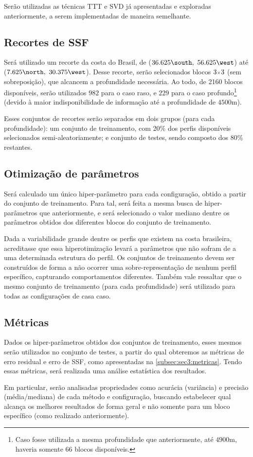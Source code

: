 Serão utilizadas as técnicas TTT e SVD já apresentadas e exploradas anteriormente, a serem implementadas de maneira semelhante.

\subsection{Recortes de SSF}

Será utilizado um recorte da costa do Brasil, de ($36.625\si{\south},~56.625\si{\west}$) até ($7.625\si{\north},~30.375\si{\west}$). Desse recorte, serão selecionados blocos $\sz{3}{3}$ (sem sobreposição), que alcancem a profundidade necessária. Ao todo, de 2160 blocos disponíveis, serão utilizados $982$ para o caso raso, e $229$ para o caso profundo\footnote{Caso fosse utilizada a mesma profundidade que anteriormente, até $4900\si{\meter}$, haveria somente $66$ blocos disponíveis.} (devido à maior indisponibilidade de informação até a profundidade de $4500\si{\meter}$).

Esses conjuntos de recortes serão separados em dois grupos (para cada profundidade): um conjunto de treinamento, com 20\% dos perfis disponíveis selecionados semi-aleatoriamente; e conjunto de testes, sendo composto dos 80\% restantes.

\subsection{Otimização de parâmetros}

Será calculado um único hiper-parâmetro para cada configuração, obtido a partir do conjunto de treinamento. Para tal, será feita a mesma busca de hiper-parâmetros que anteriormente, e será selecionado o valor mediano dentre os parâmetros obtidos dos diferentes blocos do conjunto de treinamento.

Dada a variabilidade grande dentre os perfis que existem na costa brasileira, acreditasse que essa hiperotimização levará a parâmetros que não sofram de  a uma determinada estrutura do perfil. Os conjuntos de treinamento devem ser construídos de forma a não ocorrer uma sobre-representação de nenhum perfil específico, capturando comportamentos diferentes. Também vale ressaltar que o mesmo conjunto de treinamento (para cada profundidade) será utilizado para todas as configurações de casa caso.

\subsection{Métricas}

Dados os hiper-parâmetros obtidos dos conjuntos de treinamento, esses mesmos serão utilizados no conjunto de testes, a partir do qual obteremos as métricas de erro residual e erro de SSF, como apresentadas na \cref{subsec:sec3:metricas}. Tendo essas métricas, será realizada uma análise estatística dos resultados.

Em particular, serão analisadas propriedades como acurácia (variância) e precisão (média/mediana) de cada método e configuração, buscando estabelecer qual alcança os melhores resultados de forma geral e não somente para um bloco específico (como realizado anteriormente).